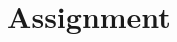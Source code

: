 \documentclass{SelimArticle} %
\title{Assignment \assnum}   %
\date{\thedate}
\begin{document}
\mytitlepage
\end{document}
